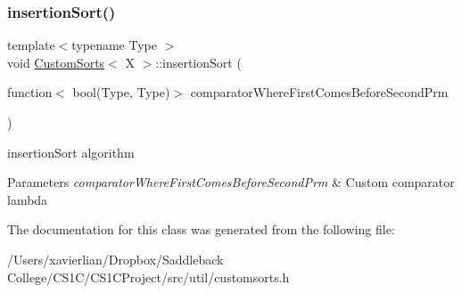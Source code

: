 \subsubsection{\texorpdfstring{insertionSort()}{insertionSort()}}
{\footnotesize\ttfamily template$<$typename Type $>$ \\
void \mbox{\hyperlink{class_custom_sorts}{Custom\+Sorts}}$<$ X $>$\+::insertion\+Sort (\begin{DoxyParamCaption}\item[{function$<$ bool(Type, Type)$>$}]{comparator\+Where\+First\+Comes\+Before\+Second\+Prm }\end{DoxyParamCaption})}



insertion\+Sort algorithm 


\begin{DoxyParams}{Parameters}
{\em comparator\+Where\+First\+Comes\+Before\+Second\+Prm} & Custom comparator lambda \\
\hline
\end{DoxyParams}


The documentation for this class was generated from the following file\+:\begin{DoxyCompactItemize}
\item 
/\+Users/xavierlian/\+Dropbox/\+Saddleback College/\+C\+S1\+C/\+C\+S1\+C\+Project/src/util/customsorts.\+h\end{DoxyCompactItemize}
